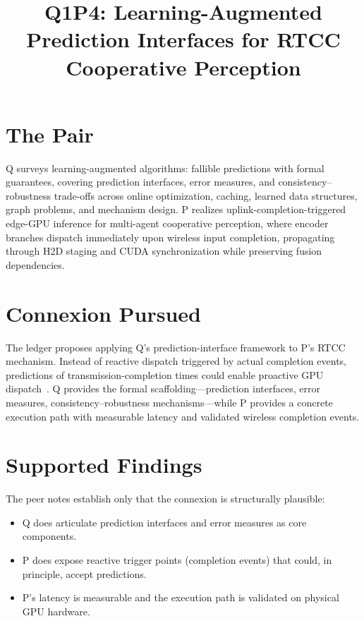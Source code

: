 \documentclass{article}
\title{Q1P4: Learning-Augmented Prediction Interfaces for RTCC Cooperative Perception}
\begin{document}
\maketitle

\section*{The Pair}

Q surveys learning-augmented algorithms: fallible predictions with formal guarantees, covering prediction interfaces, error measures, and consistency--robustness trade-offs across online optimization, caching, learned data structures, graph problems, and mechanism design. P realizes uplink-completion-triggered edge-GPU inference for multi-agent cooperative perception, where encoder branches dispatch immediately upon wireless input completion, propagating through H2D staging and CUDA synchronization while preserving fusion dependencies.

\section*{Connexion Pursued}

The ledger proposes applying Q's prediction-interface framework to P's RTCC mechanism. Instead of reactive dispatch triggered by actual completion events, predictions of transmission-completion times could enable proactive GPU dispatch~. Q provides the formal scaffolding---prediction interfaces, error measures, consistency--robustness mechanisms---while P provides a concrete execution path with measurable latency and validated wireless completion events.

\section*{Supported Findings}

The peer notes establish only that the connexion is structurally plausible:
\begin{itemize}
  \item Q does articulate prediction interfaces and error measures as core components.
  \item P does expose reactive trigger points (completion events) that could, in principle, accept predictions.
  \item P's latency is measurable and the execution path is validated on physical GPU hardware.
\end{itemize}
\end{document}
